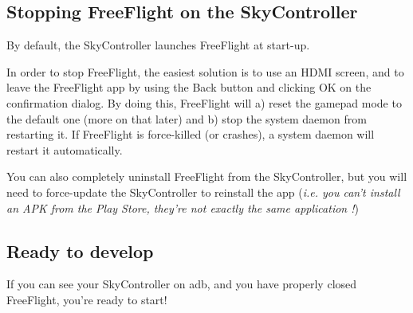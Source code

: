 \subsection{Stopping FreeFlight on the SkyController}

By default, the SkyController launches FreeFlight at start-up.

In order to stop FreeFlight, the easiest solution is to use an HDMI screen, and to leave the FreeFlight app by using the Back button and clicking OK on the confirmation dialog. By doing this, FreeFlight will a) reset the gamepad mode to the default one (more on that later) and b) stop the system daemon from restarting it. If FreeFlight is force-killed (or crashes), a system daemon will restart it automatically.

You can also completely uninstall FreeFlight from the SkyController, but you will need to force-update the SkyController to reinstall the app (\emph{i.e. you can't install an APK from the Play Store, they're not exactly the same application !})

\subsection{Ready to develop}

If you can see your SkyController on adb, and you have properly closed FreeFlight, you're ready to start!


